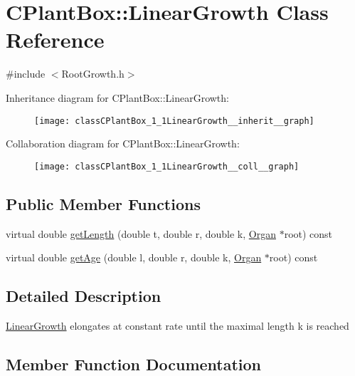 \hypertarget{classCPlantBox_1_1LinearGrowth}{}\section{C\+Plant\+Box\+:\+:Linear\+Growth Class Reference}
\label{classCPlantBox_1_1LinearGrowth}


{\ttfamily \#include $<$Root\+Growth.\+h$>$}



Inheritance diagram for C\+Plant\+Box\+:\+:Linear\+Growth\+:\nopagebreak
\begin{figure}[H]
\begin{center}
\leavevmode
\texttt{[image: classCPlantBox\_1\_1LinearGrowth\_\_inherit\_\_graph]}
\end{center}
\end{figure}


Collaboration diagram for C\+Plant\+Box\+:\+:Linear\+Growth\+:\nopagebreak
\begin{figure}[H]
\begin{center}
\leavevmode
\texttt{[image: classCPlantBox\_1\_1LinearGrowth\_\_coll\_\_graph]}
\end{center}
\end{figure}
\subsection*{Public Member Functions}
\begin{DoxyCompactItemize}
\item 
virtual double \hyperlink{classCPlantBox_1_1LinearGrowth_afffda4dacad7cd28f6addb6d3268cf1f}{get\+Length} (double t, double r, double k, \hyperlink{classCPlantBox_1_1Organ}{Organ} $\ast$root) const
\item 
virtual double \hyperlink{classCPlantBox_1_1LinearGrowth_a7880e35aa61d276647d9a602775dd87a}{get\+Age} (double l, double r, double k, \hyperlink{classCPlantBox_1_1Organ}{Organ} $\ast$root) const
\end{DoxyCompactItemize}


\subsection{Detailed Description}
\hyperlink{classCPlantBox_1_1LinearGrowth}{Linear\+Growth} elongates at constant rate until the maximal length k is reached 

\subsection{Member Function Documentation}
\mbox{\label{classCPlantBox_1_1LinearGrowth_a7880e35aa61d276647d9a602775dd87a}} 
